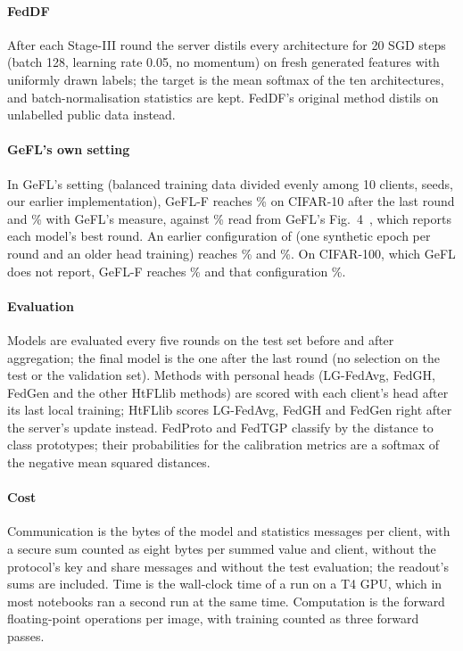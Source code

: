 \paragraph{FedDF} After each Stage-III round the server distils every architecture for 20 SGD steps (batch 128, learning
rate 0.05, no momentum) on fresh generated features with uniformly drawn labels; the target is the mean softmax of
the ten architectures, and batch-normalisation statistics are kept. FedDF's original method distils on unlabelled
public data instead.

\paragraph{GeFL's own setting} In GeFL's setting (balanced training data divided evenly among 10 clients,
 seeds, our earlier implementation), GeFL-F reaches \% on
CIFAR-10 after the last round and \% with GeFL's measure, against
\% read from GeFL's Fig.~4~\cite{kang2025gefl}, which reports each model's best round. An
earlier configuration of \ours (one synthetic epoch per round and an older head training) reaches
\% and \%. On CIFAR-100, which GeFL does not report,
GeFL-F reaches \% and that configuration \%.

\paragraph{Evaluation} Models are evaluated every five rounds on the test set before and after aggregation; the final
model is the one after the last round (no selection on the test or the validation set). Methods with personal
heads (LG-FedAvg, FedGH, FedGen and the other HtFLlib methods) are scored with each client's head after its last local
training; HtFLlib scores LG-FedAvg, FedGH and FedGen right after the server's update instead. FedProto and FedTGP classify by the distance to
class prototypes; their probabilities for the calibration metrics are a softmax of the negative mean squared distances.

\paragraph{Cost} Communication is the bytes of the model and statistics messages per client, with a secure sum
counted as eight bytes per summed value and client, without the protocol's key and share messages and without the
test evaluation; the readout's sums are included. Time is the wall-clock time of a run on a T4 GPU, which in most
notebooks ran a second run at the same time. Computation is the forward floating-point operations per image, with
training counted as three forward passes.

